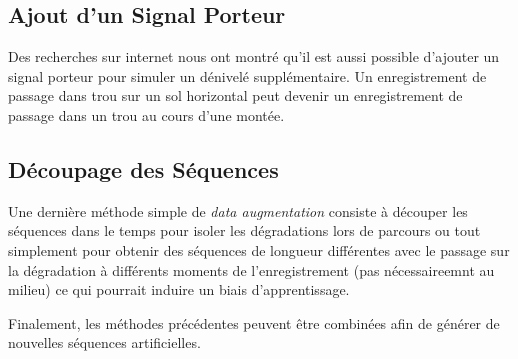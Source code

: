 \subsection{Ajout d'un Signal Porteur}
Des recherches sur internet \cite{TerryUm_ICMI2017} nous ont montré qu'il est aussi possible d'ajouter un signal porteur pour simuler un dénivelé supplémentaire. Un enregistrement de passage dans trou sur un sol horizontal peut devenir un enregistrement de passage dans un trou au cours d'une montée.

\subsection{Découpage des Séquences}
Une dernière méthode simple de \textit{data augmentation} consiste à découper les séquences dans le temps pour isoler les dégradations lors de parcours ou tout simplement pour obtenir des séquences de longueur différentes avec le passage sur la dégradation à différents moments de l'enregistrement (pas nécessaireemnt au milieu) ce qui pourrait induire un biais d'apprentissage.

Finalement, les méthodes précédentes peuvent être combinées afin de générer de nouvelles séquences artificielles.